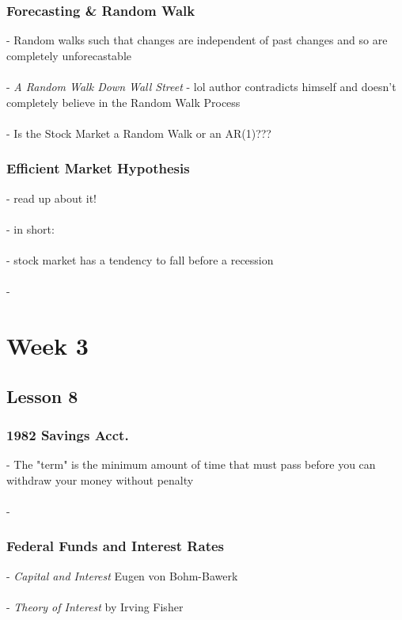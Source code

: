 \documentclass{article} %
\begin{document}
     		\subsubsection*{Forecasting \& Random Walk}
     		- Random walks such that changes are independent of past changes and so are completely unforecastable \\
     		\\
     		- \textit{A Random Walk Down Wall Street} - lol author contradicts himself and doesn't completely believe in the Random Walk Process\\
     		\\
     		- Is the Stock Market a Random Walk or an AR(1)???
     		\subsubsection*{Efficient Market Hypothesis}
     		- read up about it! \\
     		\\
     		- in short: \\
			\\
			- stock market has a tendency to fall before a recession \\
			\\
			-     		
    
     \section*{Week 3}
     
     	\subsection*{Lesson 8}
     	
     		\subsubsection*{1982 Savings Acct.}
     		
     		- The "term" is the minimum amount of time that must pass before you can withdraw your money without penalty \\
     		\\
     		- 
     		
     		\subsubsection*{Federal Funds and Interest Rates}
     		
     		- \textit{Capital and Interest} Eugen von Bohm-Bawerk \\
     		\\
     		- \textit{Theory of Interest} by Irving Fisher \\
     		\\   	
     		
\end{document}
